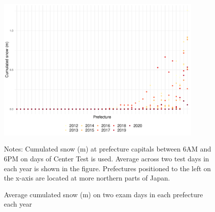 \documentclass[12pt,letterpaper]{article}
\begin{document}
\begin{figure}[H]
  \centering
  \caption{Average cumulated snow (m) on two exam days in each prefecture each year}
  \includegraphics[width = 0.9\textwidth]{../Output/images/cum_snow_diff.pdf}
  \label{fig:cum_snow_diff}
  \footnotesize
  \begin{tablenotes}
    \item Notes:
      Cumulated snow (m) at prefecture capitals between 6AM and 6PM on days of Center Test is used.
      Average across two test days in each year is shown in the figure.
      Prefectures positioned to the left on the x-axis are located at more northern parts of Japan.
  \end{tablenotes}
\end{figure}

%
\end{document}
